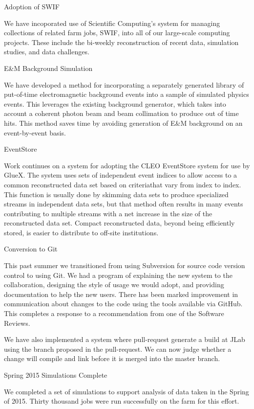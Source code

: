 Adoption of SWIF

We have incoporated use of Scientific Computing's system for managing
collections of related farm jobs, SWIF, into all of our large-scale
computing projects. These include the bi-weekly reconstruction of
recent data, simulation studies, and data challenges.

E&M Background Simulation

We have developed a method for incorporating a separately generated
library of put-of-time electromagnetic background events into a sample
of simulated physics events. This leverages the existing background
generator, which takes into account a coherent photon beam and beam
collimation to produce out of time hits. This method saves time by
avoiding generation of E&M background on an event-by-event basis.

EventStore

Work continues on a system for adopting the CLEO EventStore system for
use by GlueX. The system uses sets of independent event indices to
allow access to a common reconstructed data set based on criteriathat
vary from index to index. This function is usually done by skimming
data sets to produce specialized streams in independent data sets, but
that method often results in many events contributing to multiple
streams with a net increase in the size of the reconstructed data
set. Compact reconstructed data, beyond being efficiently stored, is
easier to distribute to off-site institutions.

Conversion to Git

This past summer we transitioned from using Subversion for source code
version control to using Git. We had a program of explaining the new
system to the collaboration, designing the style of usage we would
adopt, and providing documentation to help the new users. There has
been marked improvement in communication about changes to the code
using the tools available via GitHub. This completes a response to a
recommendation from one of the Software Reviews.

We have also implemented a system where pull-request generate a build
at JLab using the branch proposed in the pull-request. We can now
judge whether a change will compile and link before it is merged into
the master branch.

Spring 2015 Simulations Complete

We completed a set of simulations to support analysis of data taken in
the Spring of 2015. Thirty thousand jobs were run successfully on the
farm for this effort.

